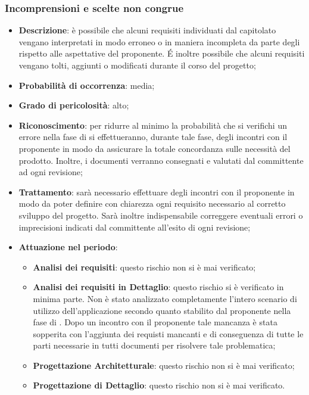 		\subsubsection{Incomprensioni e scelte non congrue}
		\begin{itemize}
			\item \textbf{Descrizione}: è possibile che alcuni requisiti individuati dal capitolato vengano interpretati in modo erroneo o in maniera incompleta da parte degli \textit{\Anas} rispetto alle aspettative del proponente. \'E inoltre possibile che alcuni requisiti vengano tolti, aggiunti o modificati durante il corso del progetto;
			\item \textbf{Probabilità di occorrenza}: media;
			\item \textbf{Grado di pericolosità}: alto;
			\item \textbf{Riconoscimento}: per ridurre al minimo la probabilità che si verifichi un errore nella fase di \textit{\AdR} si effettueranno, durante tale fase, degli incontri con il proponente in modo da assicurare la totale concordanza sulle necessità del prodotto. Inoltre, i documenti verranno consegnati e valutati dal committente ad ogni revisione;
			\item \textbf{Trattamento}: sarà necessario effettuare degli incontri con il proponente in modo da poter definire con chiarezza ogni requisito necessario al corretto sviluppo del progetto. Sarà inoltre indispensabile correggere eventuali errori o imprecisioni indicati dal committente all'esito di ogni revisione;
			\item \textbf{Attuazione nel periodo}:
			\begin{itemize}
				\item \textbf{Analisi dei requisiti}: questo rischio non si è mai verificato;
				\item \textbf{Analisi dei requisiti in Dettaglio}: questo rischio si è verificato in minima parte. Non è stato analizzato completamente l'intero scenario di utilizzo dell'applicazione secondo quanto stabilito dal proponente nella fase di \AdR. Dopo un incontro con il proponente tale mancanza è stata sopperita con l'aggiunta dei requisti mancanti e di conseguenza di tutte le parti necessarie in tutti documenti per risolvere tale problematica; 
				\item \textbf{Progettazione Architetturale}: questo rischio non si è mai verificato;
				\item \textbf{Progettazione di Dettaglio}: questo rischio non si è mai verificato. 
			\end{itemize}
		\end{itemize}
	
